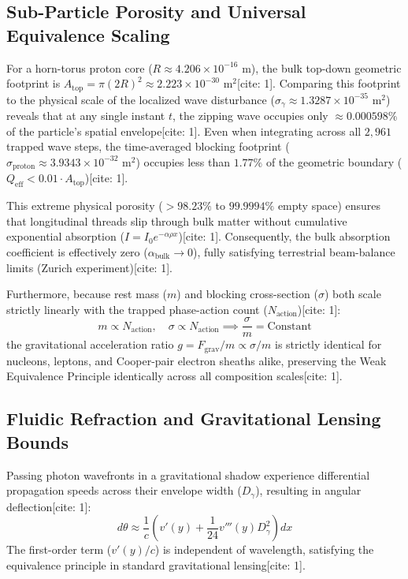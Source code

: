\documentclass[11pt,a4paper]{article}
\begin{document}
	\subsection{Sub-Particle Porosity and Universal Equivalence Scaling}
	For a horn-torus proton core ($R \approx 4.206 \times 10^{-16}\text{ m}$), the bulk top-down geometric footprint is $A_{\text{top}} = \pi (2R)^2 \approx 2.223 \times 10^{-30}\text{ m}^2$[cite: 1]. Comparing this footprint to the physical scale of the localized wave disturbance ($\sigma_\gamma \approx 1.3287 \times 10^{-35}\text{ m}^2$) reveals that at any single instant $t$, the zipping wave occupies only $\approx 0.000598\%$ of the particle's spatial envelope[cite: 1]. Even when integrating across all $2,961$ trapped wave steps, the time-averaged blocking footprint ($\sigma_{\text{proton}} \approx 3.9343 \times 10^{-32}\text{ m}^2$) occupies less than $1.77\%$ of the geometric boundary ($Q_{\text{eff}} < 0.01 \cdot A_{\text{top}}$)[cite: 1].
	
	This extreme physical porosity ($>98.23\%$ to $99.9994\%$ empty space) ensures that longitudinal threads slip through bulk matter without cumulative exponential absorption ($I = I_0 e^{-\alpha \rho x}$)[cite: 1]. Consequently, the bulk absorption coefficient is effectively zero ($\alpha_{\text{bulk}} \to 0$), fully satisfying terrestrial beam-balance limits (Zurich experiment)[cite: 1].
	
	Furthermore, because rest mass ($m$) and blocking cross-section ($\sigma$) both scale strictly linearly with the trapped phase-action count ($N_{\text{action}}$)[cite: 1]:
	\begin{equation}
		m \propto N_{\text{action}}, \quad \sigma \propto N_{\text{action}} \implies \frac{\sigma}{m} = \text{Constant}
	\end{equation}
	the gravitational acceleration ratio $g = F_{\text{grav}}/m \propto \sigma/m$ is strictly identical for nucleons, leptons, and Cooper-pair electron sheaths alike, preserving the Weak Equivalence Principle identically across all composition scales[cite: 1].
	
	\subsection{Fluidic Refraction and Gravitational Lensing Bounds}
	Passing photon wavefronts in a gravitational shadow experience differential propagation speeds across their envelope width ($D_\gamma$), resulting in angular deflection[cite: 1]:
	\begin{equation}
		d\theta \approx \frac{1}{c}\left( v'(y) + \frac{1}{24}v'''(y)D_{\gamma}^2 \right) dx
	\end{equation}
	The first-order term ($v'(y)/c$) is independent of wavelength, satisfying the equivalence principle in standard gravitational lensing[cite: 1].
	
\end{document}

